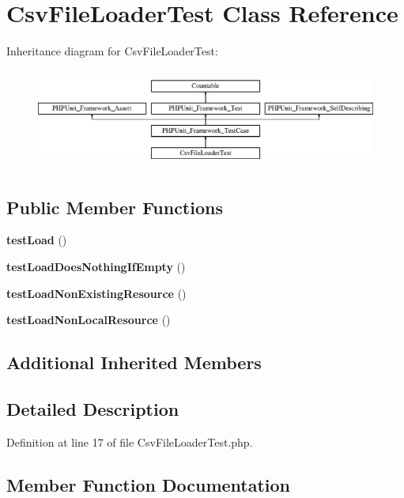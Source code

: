 \section{Csv\+File\+Loader\+Test Class Reference}
\label{class_symfony_1_1_component_1_1_translation_1_1_tests_1_1_loader_1_1_csv_file_loader_test}
Inheritance diagram for Csv\+File\+Loader\+Test\+:\begin{figure}[H]
\begin{center}
\leavevmode
\includegraphics[height=3.303835cm]{class_symfony_1_1_component_1_1_translation_1_1_tests_1_1_loader_1_1_csv_file_loader_test}
\end{center}
\end{figure}
\subsection*{Public Member Functions}
\begin{DoxyCompactItemize}
\item 
{\bf test\+Load} ()
\item 
{\bf test\+Load\+Does\+Nothing\+If\+Empty} ()
\item 
{\bf test\+Load\+Non\+Existing\+Resource} ()
\item 
{\bf test\+Load\+Non\+Local\+Resource} ()
\end{DoxyCompactItemize}
\subsection*{Additional Inherited Members}


\subsection{Detailed Description}


Definition at line 17 of file Csv\+File\+Loader\+Test.\+php.



\subsection{Member Function Documentation}
